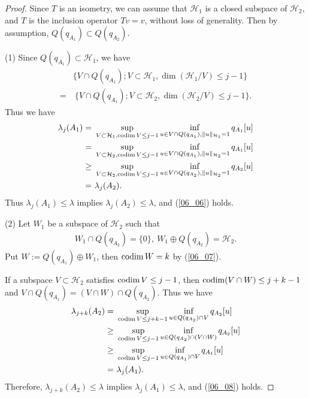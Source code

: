 \documentclass[12pt,a4paper]{article}
\def\codim{\mathop{\rm codim}\nolimits}
\begin{document}
\begin{proof}
 Since $T$ is an isometry,
we can assume that $\mathcal{H}_1$
is a closed subspace of $\mathcal{H}_2$,
and $T$ is the inclusion operator $Tv=v$,
without loss of generality.
Then by assumption,
$Q(q_{A_1})\subset Q(q_{A_2})$.

(1) Since $Q(q_{A_1})\subset \mathcal{H}_1$, we have
\begin{align*}
& \{V\cap Q(q_{A_1});V\subset \mathcal{H}_1,\dim(\mathcal{H}_1/V)\leq j-1\}\\
=&\ 
 \{V\cap Q(q_{A_1});V\subset \mathcal{H}_2,\dim(\mathcal{H}_2/V)\leq j-1\}.
\end{align*}
Thus we have
\begin{align*}
 \lambda_j(A_1)
=&\ 
\sup_{V\subset \mathcal{H}_1,\codim V\leq j-1}
\inf_{u\in V\cap Q(q_{A_1}),\|u\|_{\mathcal{H}_1}=1}
q_{A_1}[u]\\
=&\ 
\sup_{V\subset \mathcal{H}_2,\codim V\leq j-1}
\inf_{u\in V\cap Q(q_{A_1}),\|u\|_{\mathcal{H}_2}=1}
q_{A_1}[u]\\
\geq&\ 
\sup_{V\subset \mathcal{H}_2,\codim V\leq j-1}
\inf_{u\in V\cap Q(q_{A_2}),\|u\|_{\mathcal{H}_2}=1}
q_{A_2}[u]\\
=&\ 
\lambda_j(A_2).
\end{align*}
Thus 
$\lambda_j(A_1)\leq \lambda$
implies
$\lambda_j(A_2)\leq \lambda$,
and (\ref{06_06}) holds.

(2) Let $W_1$ be a subspace of $\mathcal{H}_2$ such that
\begin{align*}
 W_1\cap Q(q_{A_2})=\{0\},\ 
W_1\oplus Q(q_{A_2})=\mathcal{H}_2.
\end{align*}
Put $W:=Q(q_{A_1})\oplus W_1$, then $\codim W=k$ by (\ref{06_07}).

If a subspace $V\subset \mathcal{H}_2$
satisfies $\codim V\leq j-1$,
then $\codim(V\cap W)\leq j+k-1$
and $V\cap Q(q_{A_1})=(V\cap W)\cap Q(q_{A_2})$.
Thus we have
\begin{align*}
 \lambda_{j+k}(A_2)
=&\ 
\sup_{\codim V\leq j+k-1}
\inf_{u\in Q(q_{A_2})\cap V}
q_{A_2}[u]\\
\geq&\ 
\sup_{\codim V\leq j-1}
\inf_{u\in Q(q_{A_2})\cap (V\cap W)}
q_{A_2}[u]\\
\geq&\ 
\sup_{\codim V\leq j-1}
\inf_{u\in Q(q_{A_1})\cap V}
q_{A_1}[u]\\
=&\ 
\lambda_j(A_1).
\end{align*}
Therefore,
$\lambda_{j+k}(A_2)\leq \lambda$ implies
$\lambda_j(A_1)\leq \lambda$,
and (\ref{06_08}) holds.
\end{proof}
\end{document}
